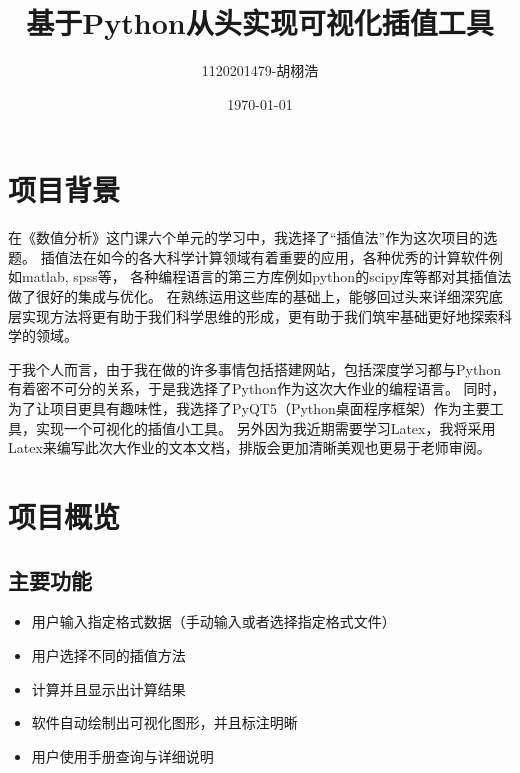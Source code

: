 \documentclass[UTF8]{ctexart}
\title{基于Python从头实现可视化插值工具}
\author{1120201479-胡栩浩}
\date{\today}
\begin{document}
    \tableofcontents
    \maketitle
    \section{项目背景}
    在《数值分析》这门课六个单元的学习中，我选择了“插值法”作为这次项目的选题。
    插值法在如今的各大科学计算领域有着重要的应用，各种优秀的计算软件例如matlab, spss等，
    各种编程语言的第三方库例如python的scipy库等都对其插值法做了很好的集成与优化。
    在熟练运用这些库的基础上，能够回过头来详细深究底层实现方法将更有助于我们科学思维的形成，更有助于我们筑牢基础更好地探索科学的领域。

    于我个人而言，由于我在做的许多事情包括搭建网站，包括深度学习都与Python有着密不可分的关系，于是我选择了Python作为这次大作业的编程语言。
    同时，为了让项目更具有趣味性，我选择了PyQT5（Python桌面程序框架）作为主要工具，实现一个可视化的插值小工具。
    另外因为我近期需要学习Latex，我将采用Latex来编写此次大作业的文本文档，排版会更加清晰美观也更易于老师审阅。
    \section{项目概览}
        \subsection{主要功能}
            \begin{itemize}
                \item 用户输入指定格式数据（手动输入或者选择指定格式文件）
                \item 用户选择不同的插值方法
                \item 计算并且显示出计算结果
                \item 软件自动绘制出可视化图形，并且标注明晰
                \item 用户使用手册查询与详细说明
            \end{itemize}
\end{document}

